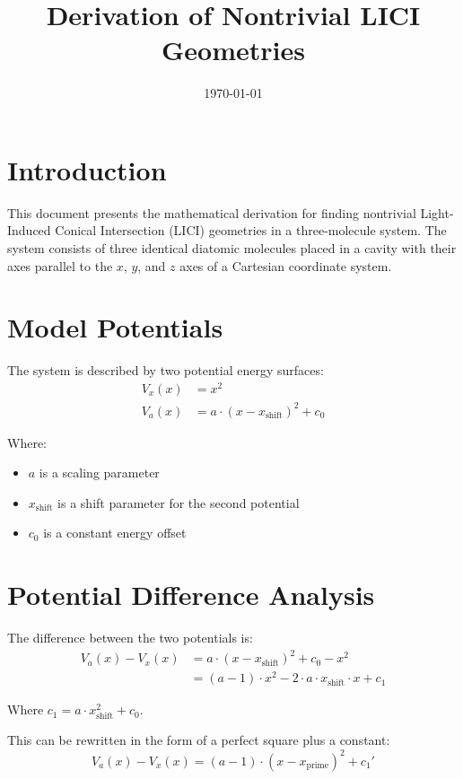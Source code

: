 \documentclass{article}
\title{Derivation of Nontrivial LICI Geometries}
\date{\today}
\begin{document}
\maketitle

\section{Introduction}

This document presents the mathematical derivation for finding nontrivial Light-Induced Conical Intersection (LICI) geometries in a three-molecule system. The system consists of three identical diatomic molecules placed in a cavity with their axes parallel to the $x$, $y$, and $z$ axes of a Cartesian coordinate system.

\section{Model Potentials}

The system is described by two potential energy surfaces:
\begin{align}
V_x(x) &= x^2 \\
V_a(x) &= a \cdot (x - x_{\text{shift}})^2 + c_0
\end{align}

Where:
\begin{itemize}
    \item $a$ is a scaling parameter
    \item $x_{\text{shift}}$ is a shift parameter for the second potential
    \item $c_0$ is a constant energy offset
\end{itemize}

\section{Potential Difference Analysis}

The difference between the two potentials is:
\begin{align}
V_a(x) - V_x(x) &= a \cdot (x - x_{\text{shift}})^2 + c_0 - x^2 \\
&= (a - 1) \cdot x^2 - 2 \cdot a \cdot x_{\text{shift}} \cdot x + c_1
\end{align}

Where $c_1 = a \cdot x_{\text{shift}}^2 + c_0$.

This can be rewritten in the form of a perfect square plus a constant:
\begin{equation}
V_a(x) - V_x(x) = (a - 1) \cdot (x - x_{\text{prime}})^2 + c_1'
\end{equation}
\end{document}
